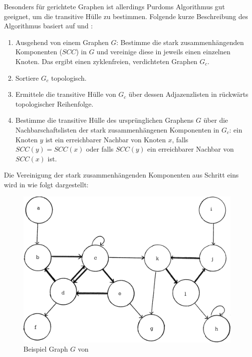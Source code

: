 Besonders für gerichtete Graphen ist allerdings Purdoms Algorithmus gut geeignet, um die transitive Hülle zu bestimmen. Folgende kurze Beschreibung des Algorithmus basiert auf \cite{purdom1970transitive} und \cite[Seite 77]{dar1993augmenting}: 

\begin{enumerate}
\item Ausgehend von einem Graphen $G$: Bestimme die stark zusammenhängenden Komponenten ($SCC$) in $G$ und vereinige diese in jeweils einen einzelnen Knoten. Das ergibt einen zyklenfreien, verdichteten Graphen $G_c$.  %
\item Sortiere $G_c$ topologisch. %
\item Ermittele die transitive Hülle von $G_c$ über dessen Adjazenzlisten in rückwärts topologischer Reihenfolge. %
\item Bestimme die transitive Hülle des ursprünglichen Graphens $G$ über die Nachbarschaftslisten der stark zusammenhängenen Komponenten in $G_c$: ein Knoten $y$ ist ein erreichbarer Nachbar von Knoten $x$, falls $SCC(y) = SCC(x)$ oder falls $SCC(y)$ ein erreichbarer Nachbar von $SCC(x)$ ist. %
\end{enumerate}

Die Vereinigung der stark zusammenhängenden Komponenten aus Schritt eins wird in \cite{purdom1970transitive} wie folgt dargestellt: 

\begin{figure}[H]
    \centering
    \includegraphics[width=.6\linewidth]{../img/purdom_g1.png}
    \caption{Beispiel Graph $G$ von \cite[Seite 78]{purdom1970transitive}}
\end{figure}

